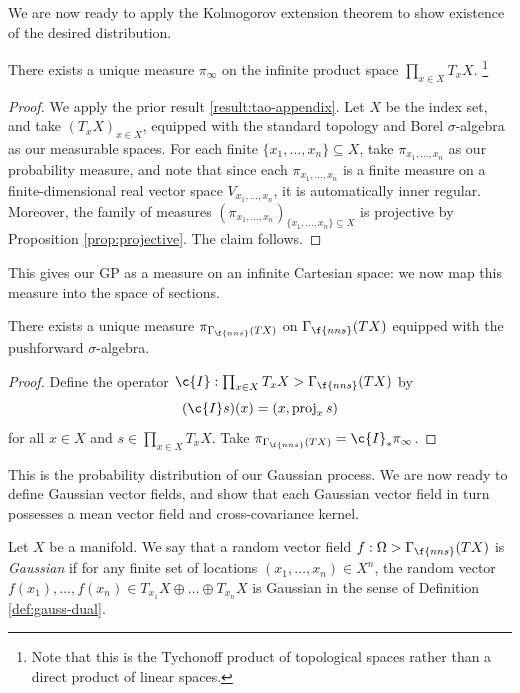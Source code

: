 We are now ready to apply the Kolmogorov extension theorem to show existence of the desired distribution.

\begin{proposition} There exists a unique measure $\pi_\infty$ on the infinite product space $\prod_{x\in X} T_x X$.
	\footnote{Note that this is the Tychonoff product of topological spaces rather than a direct product of linear spaces.}
\end{proposition}

\begin{proof}
	We apply the prior result \cref{result:tao-appendix}.
	Let $X$ be the index set, and take $(T_x X)_{x\in X}$, equipped with the standard topology and Borel $\sigma$-algebra as our measurable spaces.
	For each finite $\{x_1,\ldots,x_n\}\subseteq X$, take $\pi_{x_1,\ldots,x_n}$ as our probability measure, and note that since each $\pi_{x_1,\ldots,x_n}$ is a finite measure on a finite-dimensional real vector space $V_{x_1,\ldots,x_n}$, it is automatically inner regular.
	Moreover, the family of measures $(\pi_{x_1,\ldots,x_n})_{\{x_1,\ldots,x_n\}\subseteq X}$ is projective by Proposition \ref{prop:projective}.
	The claim follows.
\end{proof}

This gives our GP as a measure on an infinite Cartesian space: we now map this measure into the space of sections.

\begin{corollary} \label{thm:exists_unique}
	There exists a unique measure $\pi_{\Gamma_{\f{nns}}(TX)}$ on $\Gamma_{\f{nns}}(TX)$ equipped with the pushforward $\sigma$-algebra.
\end{corollary}

\begin{proof}
	Define the operator $\c{I} : \prod_{x\in X} T_x X \-> \Gamma_{\f{nns}}(TX)$ by \[ (\c{I}s)(x) = (x,\proj_xs) \] for all $x \in X$ and $s \in \prod_{x\in X} T_x X$.
	Take $\pi_{\Gamma_{\f{nns}}(TX)} = \c{I}_* \pi_\infty$.
\end{proof}

This is the probability distribution of our Gaussian process.
We are now ready to define Gaussian vector fields, and show that each Gaussian vector field in turn possesses a mean vector field and cross-covariance kernel.

\begin{definition}
	\label{def:vect-gp2}
	Let $X$ be a manifold.
	We say that a random vector field $f : \Omega \-> \Gamma_{\f{nns}}(TX)$ is \emph{Gaussian} if for any finite set of locations $(x_1,\ldots,x_n) \in X^n$, the random vector $f(x_1),\ldots,f(x_n) \in T_{x_1}X \oplus \ldots \oplus T_{x_n}X$ is Gaussian in the sense of Definition \ref{def:gauss-dual}.
\end{definition}

